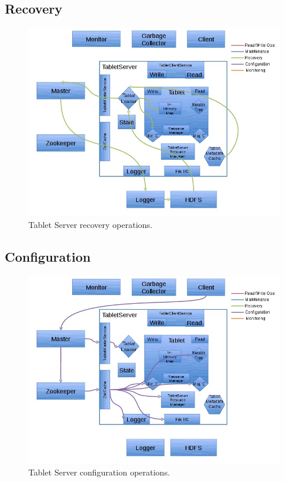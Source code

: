 \documentclass[letterpaper,onecolumn,12pt,titlepage]{article}
\begin{document}
\subsection{Recovery}
\begin{figure}[htbp]
\center
\includegraphics[scale=.6]{images/tserver_recovery.jpg}
\caption{\label{fig_ts_recovery} Tablet Server recovery operations.}
\end{figure}

\subsection{Configuration}
\begin{figure}[htbp]
\center
\includegraphics[scale=.6]{images/tserver_config.jpg}
\caption{\label{fig_ts_config} Tablet Server configuration operations.}
\end{figure}
\end{document}
